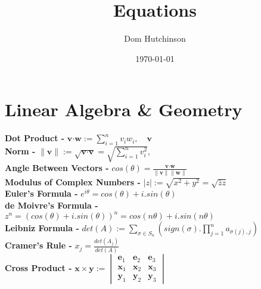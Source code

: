 \documentclass[11pt,a4paper]{article}
\begin{document}
\pagestyle{fancy}
\setlength\parindent{0pt}
\allowdisplaybreaks
{}

\renewcommand{\headrulewidth}{0pt}
\newcommand{\vect}[1]{\boldsymbol{#1}}
\newcommand{\subtitle}[2]{\textbf{#1}\textit{#2} \\}
\newcommand{\dotprod}[0]{\boldsymbol{\cdot}}
\newcommand{\real}[0]{\mathbb{R}}
\newcommand{\nat}[0]{\mathbb{N}}
\newcommand{\field}[0]{\mathbb{F}}
\newcommand{\vectorspace}[0]{\mathbb{V}}
\newcommand{\basis}[0]{\mathbb{B}}
\newcommand{\complex}[0]{\mathbb{C}}
\newcommand{\innerproduct}[1]{\langle #1 \rangle}

\title{Equations}
\author{Dom Hutchinson}
\date{\today}
\maketitle

\fancyhead[R]{\today}

\section*{Linear Algebra \& Geometry}
\textbf{Dot Product - }$\vect{v} \dotprod \vect{w} := \sum_{i=1}^n v_i w_i,\quad \vect{v}$\\
\textbf{Norm - } $\| \vect{v} \| := \sqrt{\vect{v} \dotprod \vect{v}} = \sqrt{\sum_{i=1}^n v_i^2},$\\
\textbf{Angle Between Vectors - } $cos(\theta) = \displaystyle{\frac{\vect{v} \dotprod \vect{w}}{\|\vect{v}\|\|\vect{w}\|}}$\\
\textbf{Modulus of Complex Numbers - } $|z| := \sqrt{x^2 + y^2} = \sqrt{\bar{z}z}$\\
\textbf{Euler's Formula - } $e^{i\theta} = cos(\theta) + i.sin(\theta)$\\
\textbf{de Moivre's Formula - } $z^n = (cos(\theta) + i.sin(\theta))^n = cos(n\theta) + i.sin(n\theta)$\\
\textbf{Leibniz Formula - } $det(A) := \sum_{\sigma \in S_n}\left(sign(\sigma) . \prod_{j=1}^n a_{\sigma(j), j}\right)$\\
\textbf{Cramer's Rule - } $\displaystyle{x_j = \frac{det(A_j)}{det(A)}}$\\
\textbf{Cross Product - } $\displaystyle{\vect{x} \times \vect{y} := \begin{vmatrix} \vect{e}_1 & \vect{e}_2 & \vect{e}_3 \\ \vect{x}_1 & \vect{x}_2 & \vect{x}_3 \\ \vect{y}_1 & \vect{y}_2 & \vect{y}_3 \end{vmatrix}}$
\end{document}

